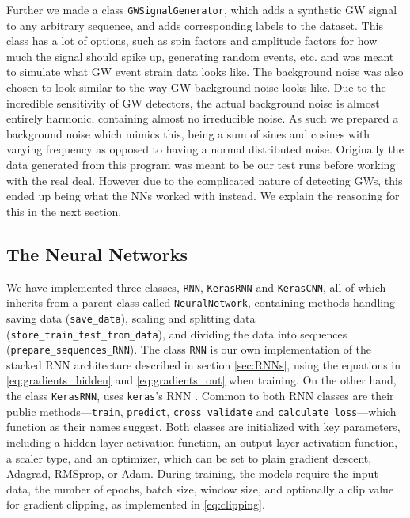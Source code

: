\documentclass[%
reprint,
amsmath,amssymb,
aps,
]{revtex4-2}
\begin{document}
Further we made a class \texttt{GWSignalGenerator}, which adds a synthetic GW signal to any arbitrary sequence, and adds corresponding labels to the dataset. This class has a lot of options, such as spin factors and amplitude factors for how much the signal should spike up, generating random events, etc. and was meant to simulate what GW event strain data looks like. The background noise was also chosen to look similar to the way GW background noise looks like. Due to the incredible sensitivity of GW detectors, the actual background noise is almost entirely harmonic, containing almost no irreducible noise. As such we prepared a background noise which mimics this, being a sum of sines and cosines with varying frequency as opposed to having a normal distributed noise. Originally the data generated from this program was meant to be our test runs before working with the real deal. However due to the complicated nature of detecting GWs, this ended up being what the NNs worked with instead. We explain the reasoning for this in the next section.

\subsection{The Neural Networks}
We have implemented three classes, \texttt{RNN}, \texttt{KerasRNN} and \texttt{KerasCNN}, all of which inherits from a parent class called \texttt{NeuralNetwork}, containing methods handling saving data (\texttt{save\_data}), 
scaling and splitting data (\texttt{store\_train\_test\_from\_data}), and dividing the data into sequences (\texttt{prepare\_sequences\_RNN}). The class \texttt{RNN} is our own implementation of the stacked RNN architecture described in section \ref{sec:RNNs}, using the equations in \eqref{eq:gradients_hidden} and \eqref{eq:gradients_out} when training. On the other hand, the class \texttt{KerasRNN}, uses \texttt{keras}'s RNN \cite{keras_recurrent_layers}. Common to both RNN classes are their public methods—\texttt{train}, \texttt{predict}, \texttt{cross\_validate} and \texttt{calculate\_loss}—which function as their names suggest. Both classes are initialized with key parameters, including a hidden-layer activation function, an output-layer activation function, a scaler type, and an optimizer, which can be set to plain gradient descent, Adagrad, RMSprop, or Adam. During training, the models require the input data, the number of epochs, batch size, window size, and optionally a clip value for gradient clipping, as implemented in \eqref{eq:clipping}. 
\end{document}
